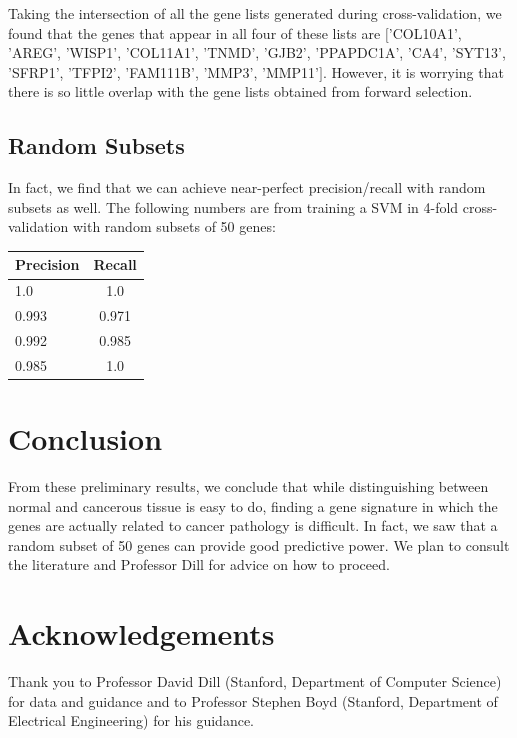 \documentclass[10.75pt]{article}
\begin{document}
Taking the intersection of all the gene lists generated during cross-validation, we found that the genes that appear in all four of these lists are $[$'COL10A1', 'AREG', 'WISP1', 'COL11A1', 'TNMD', 'GJB2', 'PPAPDC1A', 'CA4', 'SYT13', 'SFRP1', 'TFPI2', 'FAM111B', 'MMP3', 'MMP11'$]$. However, it is worrying that there is so little overlap with the gene lists obtained from forward selection.

\subsection{Random Subsets}

In fact, we find that we can achieve near-perfect precision/recall with random subsets as well. The following numbers are from training a SVM in 4-fold cross-validation with random subsets of 50 genes: \\
\begin{tabular}{ l | c }
    Precision & Recall\\
  \hline 
    1.0 & 1.0 \\
    0.993 & 0.971 \\
    0.992 & 0.985 \\
    0.985 & 1.0 \\
  \hline
\end{tabular}
\section{Conclusion}
From these preliminary results, we conclude that while distinguishing between normal and cancerous tissue is easy to do, finding a gene signature in which the genes are actually related to cancer pathology is difficult. In fact, we saw that a random subset of 50 genes can provide good predictive power. We plan to consult the literature and Professor Dill for advice on how to proceed. 

\section{Acknowledgements}
Thank you to Professor David Dill (Stanford, Department of Computer Science) for data and guidance and to Professor Stephen Boyd (Stanford, Department of Electrical Engineering) for his guidance.
\end{document}
